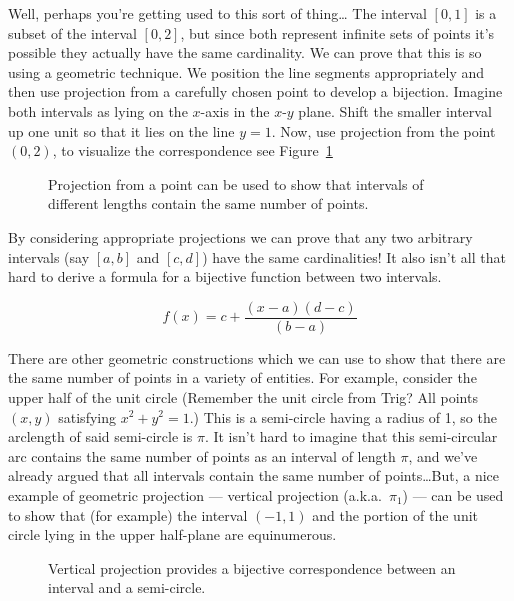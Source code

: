Well, perhaps you're getting used to this sort of thing\ldots   
The interval $[0, 1]$ is a subset of the interval $[0, 2]$, 
but since both represent infinite sets of points
it's possible they actually have the same cardinality.  
We can prove that this is so using a geometric technique. 
We position the line segments appropriately
and then use projection from a carefully chosen point to 
develop a bijection.  Imagine both intervals as lying on 
the $x$-axis in the $x$-$y$ plane.  Shift the
smaller interval up one unit so that it lies on the line 
$y = 1$.  Now, use projection
from the point $(0, 2)$, to visualize the correspondence 
see Figure~\ref{fig:equiv_intervals}

\begin{figure}[!hbtp]

\caption[Equivalent intervals.]{Projection from a point can be %
used to show that intervals of %
different lengths contain the same number of points.}
\label{fig:equiv_intervals} 
\end{figure}


By considering appropriate projections we can prove that any two arbitrary
intervals (say $[a, b]$ and $[c, d]$) have the same cardinalities!  It also
isn't all that hard to derive a formula for a bijective function between two
intervals.

\[ f(x) = c + \frac{(x - a)(d - c)}{(b - a)} \]

There are other geometric constructions which we can use to show that
there are the same number of points in a variety of entities.  For example,
consider the upper half of the unit circle (Remember the unit circle from
Trig?  All points $(x, y)$ satisfying $x^2 + y^2 = 1$.)  This is a 
semi-circle having a radius of 1, so the arclength of said semi-circle 
is $\pi$.  It isn't hard to imagine
that this semi-circular arc contains the same number of points as an interval
of length $\pi$, and we've already argued that all intervals contain the same
number of points\ldots   But, a nice example of geometric projection ---  
vertical projection (a.k.a.\ $\pi_1$) ---  can be used to show that 
(for example) the interval
$(-1, 1)$ and the portion of the unit circle lying in the upper 
half-plane are equinumerous.

\begin{figure}[!hbtp]

\caption[An interval is equivalent to a semi-circle.]{Vertical projection %
provides a bijective correspondence between an interval and a semi-circle. }
\label{fig:interval_n_semicircle} 
\end{figure}

